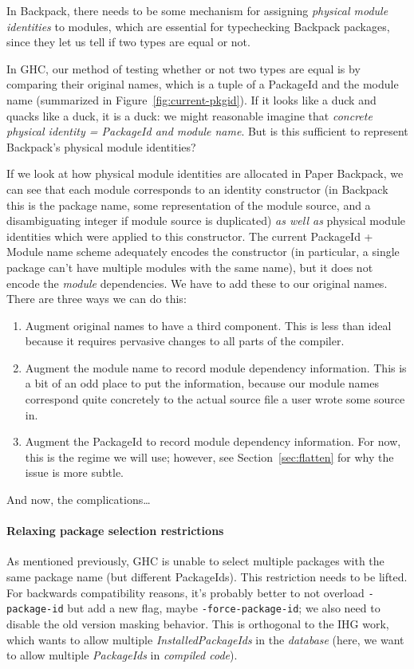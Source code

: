 \documentclass{article}
\begin{document}
In Backpack, there needs to be some mechanism for assigning
\emph{physical module identities} to modules, which are essential for
typechecking Backpack packages, since they let us tell if two types are
equal or not.

In GHC, our method of testing whether or not two types are equal is by
comparing their original names, which is a tuple of a PackageId and the
module name (summarized in Figure~\ref{fig:current-pkgid}).  If it looks
like a duck and quacks like a duck, it is a duck: we might reasonable
imagine that \emph{concrete physical identity = PackageId and module
name}.  But is this sufficient to represent Backpack's physical module
identities?

If we look at how physical module identities are allocated in Paper Backpack,
we can see that each module corresponds to an identity constructor (in
Backpack this is the package name, some representation of the module
source, and a disambiguating integer if module source is duplicated)
\emph{as well as} physical module identities which were applied to
this constructor.  The current PackageId + Module name scheme adequately encodes
the constructor (in particular, a single package can't have multiple modules
with the same name), but it does not encode the \emph{module} dependencies.
We have to add these to our original names.  There are three ways we can do
this:

\begin{enumerate}
    \item Augment original names to have a third component.  This is less than ideal because it requires pervasive changes to all parts of the compiler.
    \item Augment the module name to record module dependency information.  This is a bit of an odd place to put the information, because our module names correspond quite concretely to the actual source file a user wrote some source in.
    \item Augment the PackageId to record module dependency information.  For now, this is the regime we will use; however, see Section~\ref{sec:flatten} for why the issue is more subtle.
\end{enumerate}

And now, the complications\ldots

\paragraph{Relaxing package selection restrictions}  As mentioned
previously, GHC is unable to select multiple packages with the same
package name (but different PackageIds).  This restriction needs to be
lifted.  For backwards compatibility reasons, it's probably better to
not overload \verb|-package-id| but add a new flag, maybe \verb|-force-package-id|;
we also need to disable the old version masking behavior.  This is orthogonal
to the IHG work, which wants to allow multiple \emph{InstalledPackageIds} in the
\emph{database} (here, we want to allow multiple \emph{PackageIds} in \emph{compiled code}).
\end{document}
